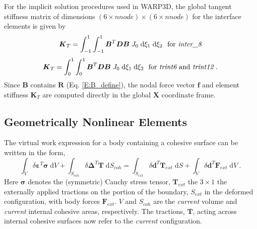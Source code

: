 \documentclass[11pt]{report}
\numberwithin{equation}{section}
\newcommand{\bmf } {\boldsymbol }  %
\newcommand{\ti}{\emph}
\newcommand{\NI}{\noindent}
\begin{document}
For the implicit solution procedures used in WARP3D, the global tangent 
stiffness matrix of dimensions $(6 \times nnode) \times (6 \times nnode )$ for 
the interface elements is given by
%
\begin{equation}
\bmf{K}_T = \int_{-1}^1  \int_{-1}^1 
\bmf{B}^T \bmf{D} \bmf{B} \; J_0  \;\mathrm{d}\xi_1  \;\mathrm{d}\xi_2
 \ \ \mathrm{for\ \ti{inter\_8}} 
\end {equation}
%
%
\begin{equation}
\bmf{K}_T = \int_{0}^1  \int_{0}^{1} 
\bmf{B}^T \bmf{D} \bmf{B} \; J_0  \;\mathrm{d}\xi_1  \;\mathrm{d}\xi_2   
\ \ \mathrm{for\ \ti{trint6}\ and\ \ti{trint12}} \ .
\end {equation}
\NI Since $\bmf{B}$ contains $\bmf{R}$ (Eq. \ref{E:B_define}),
the nodal force vector $\bmf{f}$ 
and element stiffness $\bmf{K}_T$
are computed directly in the global $ \bmf{X}$ coordinate frame.
%
\subsection{Geometrically Nonlinear Elements}
The virtual work expression for a body containing a cohesive surface can 
be written in the form,
%
\begin{equation}
\int_{V} \delta \bmf{\varepsilon}^T \bmf{\sigma} \;\mathrm{d}V +
\int_{S_{coh}} \delta \bmf{\Delta}^T \bmf{T} \;\mathrm{d}S_{coh} =
\int_{S_{ext}} \delta \bmf{d}^T \bmf{T}_{ext} \;\mathrm{d}S+
\int_{V} \delta \bmf{d}^T \bmf{F}_{ext} \;\mathrm{d}V \ .
\end {equation}
%
\noindent Here $\bmf{\sigma}$ denotes the (symmetric) Cauchy stress tensor, 
$\bmf{T}_{ext}$ the ${3 \times 1}$ the externally applied tractions on the portion of the boundary,
$S_{ext}$ in the deformed configuration, with body forces $\bmf{F}_{ext}$. $V$
and $S_{coh}$ are the \ti{current} volume and \ti{current} internal cohesive areas, respectively. 
The tractions, $\bmf{T}$, acting across internal cohesive surfaces now 
refer to the \ti{current} configuration.
\end{document}
